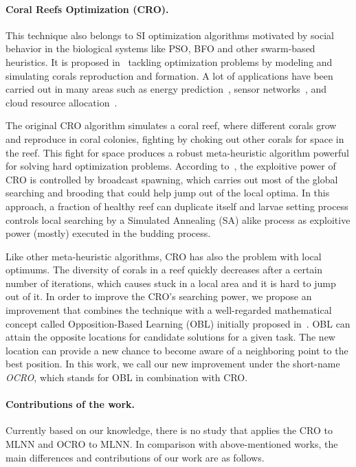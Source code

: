 \documentclass[11pt,twoside]{article}
\begin{document}
\begin{multicols}{2}
\paragraph{Coral Reefs Optimization (CRO).} This technique also belongs to SI optimization algorithms motivated by social behavior in the biological systems like PSO, BFO and other swarm-based heuristics. It is proposed in~\citep{ref_salcedo_sanz1} tackling optimization problems by modeling and simulating corals reproduction and formation. A lot of applications have been carried out in many areas such as energy prediction~\citep{ref_salcedo_sanz2, ref_salcedo_sanz4}, sensor networks~\citep{ref_li}, and cloud resource allocation~\citep{ref_ficco}. 

The original CRO algorithm simulates a coral reef, where different corals grow and reproduce in coral colonies, fighting by choking out other corals for space in the reef. This fight for space produces a robust meta-heuristic algorithm powerful for solving hard optimization problems. According to~\citep{ref_salcedo_sanz5}, the exploitive power of CRO is controlled by broadcast spawning, which carries out most of the global searching and brooding that could help jump out of the local optima. In this approach, a fraction of healthy reef can duplicate itself and larvae setting process controls local searching by a Simulated Annealing (SA) alike process as exploitive power (mostly) executed in the budding process. 

Like other meta-heuristic algorithms, CRO has also the problem with local optimums. The diversity of corals in a reef quickly decreases after a certain number of iterations, which causes stuck in a local area and it is hard to jump out of it. In order to improve the CRO's searching power, we propose an improvement that combines the technique with a well-regarded mathematical concept called Opposition-Based Learning (OBL) initially proposed in~\citep{ref_Tizhoosh}. OBL can attain the opposite locations for candidate solutions for a given task. The new location can provide a new chance to become aware of a neighboring point to the best position. In this work, we call our new improvement under the short-name \textit{OCRO}, which stands for OBL in combination with CRO. 

\paragraph{Contributions of the work.} Currently based on our knowledge, there is no study that applies the CRO to MLNN and OCRO to MLNN.  In comparison with above-mentioned works, the main differences and contributions of our work are as follows.


\end{multicols}
\end{document}
